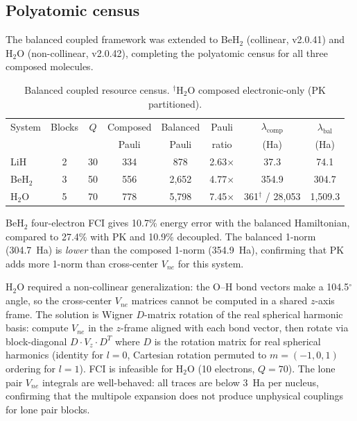 \documentclass[aps,pra,twocolumn,superscriptaddress,longbibliography]{revtex4-2}
\begin{document}
\subsection{Polyatomic census}
\label{sec:polyatomic}

The balanced coupled framework was extended to BeH$_2$ (collinear,
v2.0.41) and H$_2$O (non-collinear, v2.0.42), completing the
polyatomic census for all three composed molecules.

\begin{table}[h]
\centering
\begin{tabular}{lccccccc}
\hline
System & Blocks & $Q$ & Composed & Balanced & Pauli & $\lambda_\text{comp}$ & $\lambda_\text{bal}$ \\
       &        &     & Pauli    & Pauli    & ratio & (Ha)                  & (Ha) \\
\hline
LiH    & 2 & 30 & 334   & 878   & 2.63$\times$ & 37.3  & 74.1  \\
BeH$_2$ & 3 & 50 & 556   & 2,652 & 4.77$\times$ & 354.9 & 304.7 \\
H$_2$O & 5 & 70 & 778   & 5,798 & 7.45$\times$ & 361$^\dagger$ / 28,053 & 1,509.3 \\
\hline
\end{tabular}
\caption{Balanced coupled resource census. $^\dagger$H$_2$O composed electronic-only (PK partitioned).}
\label{tab:balanced_census}
\end{table}

BeH$_2$ four-electron FCI gives 10.7\% energy error with the
balanced Hamiltonian, compared to 27.4\% with PK and 10.9\%
decoupled.  The balanced 1-norm (304.7~Ha) is \emph{lower} than the
composed 1-norm (354.9~Ha), confirming that PK adds more 1-norm than
cross-center $V_{ne}$ for this system.

H$_2$O required a non-collinear generalization: the O--H bond vectors
make a 104.5$^\circ$ angle, so the cross-center $V_{ne}$ matrices
cannot be computed in a shared $z$-axis frame.  The solution is Wigner
$D$-matrix rotation of the real spherical harmonic basis: compute
$V_{ne}$ in the $z$-frame aligned with each bond vector, then rotate
via block-diagonal $D \cdot V_z \cdot D^T$ where $D$ is the rotation
matrix for real spherical harmonics (identity for $l = 0$, Cartesian
rotation permuted to $m = (-1, 0, 1)$ ordering for $l = 1$).  FCI is
infeasible for H$_2$O (10 electrons, $Q = 70$).  The lone pair
$V_{ne}$ integrals are well-behaved: all traces are below 3~Ha per
nucleus, confirming that the multipole expansion does not produce
unphysical couplings for lone pair blocks.
\end{document}

